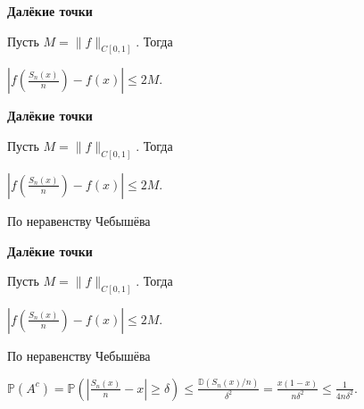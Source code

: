 \documentclass[11pt]{article}
\begin{document}
\newpage

\begin{center}
{\color{notaeYELLOW}\bfseries\fontsize{44}{52}\selectfont Далёкие точки}
\end{center}
\vspace*{\fill}
\begin{center}
\fontsize{36}{43}\selectfont
Пусть $M = \|f\|_{C[0,1]}$. Тогда\par\vspace{0.4in}
$\left| f\!\left(\frac{S_n(x)}{n}\right) - f(x) \right| \leqslant 2M.$\par\vspace{0.4in}
\end{center}
\vspace*{\fill}

\newpage

\begin{center}
{\color{notaeYELLOW}\bfseries\fontsize{44}{52}\selectfont Далёкие точки}
\end{center}
\vspace*{\fill}
\begin{center}
\fontsize{36}{43}\selectfont
Пусть $M = \|f\|_{C[0,1]}$. Тогда\par\vspace{0.4in}
$\left| f\!\left(\frac{S_n(x)}{n}\right) - f(x) \right| \leqslant 2M.$\par\vspace{0.4in}
По неравенству Чебышёва \par\vspace{0.4in}
\end{center}
\vspace*{\fill}

\newpage

\begin{center}
{\color{notaeYELLOW}\bfseries\fontsize{44}{52}\selectfont Далёкие точки}
\end{center}
\vspace*{\fill}
\begin{center}
\fontsize{36}{43}\selectfont
Пусть $M = \|f\|_{C[0,1]}$. Тогда\par\vspace{0.4in}
$\left| f\!\left(\frac{S_n(x)}{n}\right) - f(x) \right| \leqslant 2M.$\par\vspace{0.4in}
По неравенству Чебышёва \par\vspace{0.4in}
$\mathbb{P}(A^c) = \mathbb{P}\left( \left|\frac{S_n(x)}{n} - x\right| \geqslant \delta \right) \leqslant \frac{\mathbb{D}(S_n(x)/n)}{\delta^2} = \frac{x(1-x)}{n\delta^2} \leqslant \frac{1}{4n\delta^2}.$\par\vspace{0.4in}
\end{center}
\vspace*{\fill}
\end{document}
